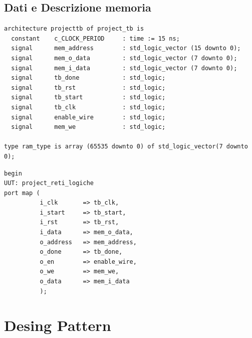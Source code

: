 \documentclass[11pt, a4paper]{article}
\begin{document}
\subsection{Dati e Descrizione memoria}
\begin{lstlisting}[title={Fig.1}]
architecture projecttb of project_tb is
  constant    c_CLOCK_PERIOD     : time := 15 ns;
  signal      mem_address        : std_logic_vector (15 downto 0);
  signal      mem_o_data         : std_logic_vector (7 downto 0);
  signal      mem_i_data         : std_logic_vector (7 downto 0);
  signal      tb_done            : std_logic;
  signal      tb_rst             : std_logic;
  signal      tb_start           : std_logic;
  signal      tb_clk             : std_logic;
  signal      enable_wire        : std_logic;
  signal      mem_we             : std_logic;

type ram_type is array (65535 downto 0) of std_logic_vector(7 downto 0);
\end{lstlisting}
\begin{lstlisting}[title={Fig. 2}]
begin
UUT: project_reti_logiche
port map (
          i_clk       => tb_clk,
          i_start     => tb_start,
          i_rst       => tb_rst,
          i_data      => mem_o_data,
          o_address   => mem_address,
          o_done      => tb_done,
          o_en        => enable_wire,
          o_we        => mem_we,
          o_data      => mem_i_data
          );
\end{lstlisting}

\pagebreak
\section{Desing Pattern}
\end{document}
